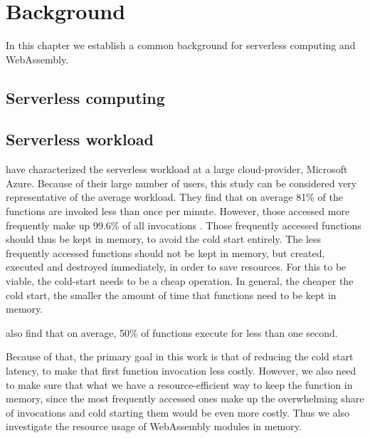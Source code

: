 \chapter{Background}

In this chapter we establish a common background for serverless computing and WebAssembly.

\section{Serverless computing}

\section{Serverless workload}

\citeauthor{Shahrad2020} have characterized the serverless workload at a large cloud-provider, Microsoft Azure. Because of their large number of users, this study can be considered very representative of the average workload.
They find that on average 81\% of the functions are invoked less than once per minute. However, those accessed more frequently make up 99.6\% of all invocations \cite{Shahrad2020}.
Those frequently accessed functions should thus be kept in memory, to avoid the cold start entirely. The less frequently accessed functions should not be kept in memory, but created, executed and destroyed immediately, in order to save resources. For this to be viable, the cold-start needs to be a cheap operation. In general, the cheaper the cold start, the smaller the amount of time that functions need to be kept in memory.

\citeauthor{Shahrad2020} also find that on average, 50\% of functions execute for less than one second.

\begin{quote}
\end{quote}

Because of that, the primary goal in this work is that of reducing the cold start latency, to make that first function invocation less costly. However, we also need to make sure that what we have a resource-efficient way to keep the function in memory, since the most frequently accessed ones make up the overwhelming share of invocations and cold starting them would be even more costly. Thus we also investigate the resource usage of WebAssembly modules in memory.

